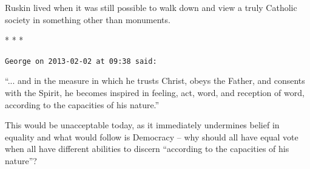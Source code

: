 

Ruskin lived when it was still possible to walk down and view a truly Catholic society in something other than monuments.



\begin{center}* * *\end{center}

\begin{footnotesize}
\begin{sffamily}
\texttt{George on 2013-02-02 at 09:38 said:}

``... and in the measure in which he trusts Christ, obeys the Father, and consents with the Spirit, he becomes inspired in feeling, act, word, and reception of word, according to the capacities of his nature.''

This would be unacceptable today, as it immediately undermines belief in equality and what would follow is Democracy -- why should all have equal vote when all have different abilities to discern ``according to the capacities of his nature''?


\hfill

\end{sffamily}
\end{footnotesize}

